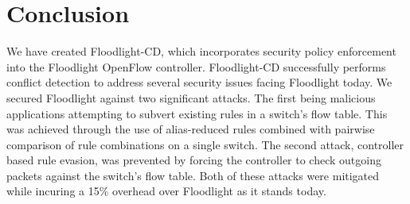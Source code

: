 \section{Conclusion}
\label{sec:conclusion}

We have created Floodlight-CD, which incorporates security policy enforcement into the Floodlight OpenFlow controller.
Floodlight-CD successfully performs conflict detection to address several security issues facing Floodlight today.
We secured Floodlight against two significant attacks.
The first being malicious applications attempting to subvert existing rules in a switch's flow table.
This was achieved through the use of alias-reduced rules combined with pairwise comparison of rule combinations on a single switch.
The second attack, controller based rule evasion, was prevented by forcing the controller to check outgoing packets against the switch's flow table.
Both of these attacks were mitigated while incuring a 15\% overhead over Floodlight as it stands today. 

